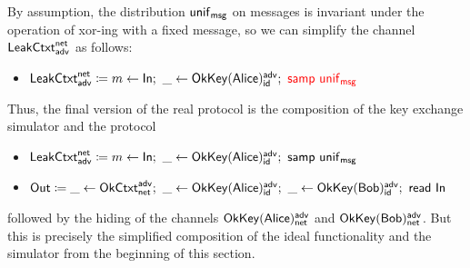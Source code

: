 \noindent By assumption, the distribution $\mathsf{unif}_{\mathsf{msg}}$ on messages is invariant under the operation of xor-ing with a fixed message, so we can simplify the channel $\mathsf{LeakCtxt}^{\mathsf{net}}_{\mathsf{adv}}$ as follows:
\begin{itemize}
\item $\mathsf{LeakCtxt}^{\mathsf{net}}_{\mathsf{adv}} \coloneqq m \leftarrow \mathsf{In}; \ \_ \leftarrow \mathsf{OkKey}(\mathsf{Alice})^{\mathsf{adv}}_{\mathsf{id}}; \ {\color{red} \mathsf{samp} \ \mathsf{unif}_{\mathsf{msg}}}$
\end{itemize}

\noindent Thus, the final version of the real protocol is the composition of the key exchange simulator and the protocol
\begin{itemize}
\item $\LeakCtxt^\net_\adv \coloneqq m \leftarrow \In; \ \_ \leftarrow \OkKey(\Alice)^\adv_\id; \ \samp{\unif_\msg}$
\item $\mathsf{Out} \coloneqq \_ \leftarrow \mathsf{OkCtxt}^{\mathsf{adv}}_{\mathsf{net}}; \ \_ \leftarrow \mathsf{OkKey}(\mathsf{Alice})^{\mathsf{adv}}_{\mathsf{id}}; \ \_ \leftarrow \mathsf{OkKey}(\mathsf{Bob})^{\mathsf{adv}}_{\mathsf{id}}; \ \mathsf{read} \ \mathsf{In}$
\end{itemize}
followed by the hiding of the channels $\mathsf{OkKey}(\mathsf{Alice})^{\mathsf{adv}}_{\mathsf{net}}$ and $\mathsf{OkKey}(\mathsf{Bob})^{\mathsf{adv}}_{\mathsf{net}}$. But this is precisely the simplified composition of the ideal functionality and the simulator from the beginning of this section.